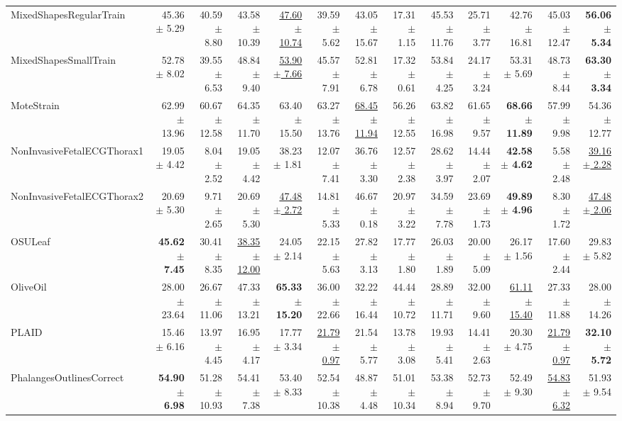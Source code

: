 \begin{landscape}
\begin{longtable}{lrrrrrrrrrrrr}
MixedShapesRegularTrain & 45.36 $\pm$ 5.29 & 40.59 $\pm$ 8.80 & 43.58 $\pm$ 10.39 & \underline{47.60 $\pm$ 10.74} & 39.59 $\pm$ 5.62 & 43.05 $\pm$ 15.67 & 17.31 $\pm$ 1.15 & 45.53 $\pm$ 11.76 & 25.71 $\pm$ 3.77 & 42.76 $\pm$ 16.81 & 45.03 $\pm$ 12.47 & \textbf{56.06 $\pm$ 5.34} \\
MixedShapesSmallTrain & 52.78 $\pm$ 8.02 & 39.55 $\pm$ 6.53 & 48.84 $\pm$ 9.40 & \underline{53.90 $\pm$ 7.66} & 45.57 $\pm$ 7.91 & 52.81 $\pm$ 6.78 & 17.32 $\pm$ 0.61 & 53.84 $\pm$ 4.25 & 24.17 $\pm$ 3.24 & 53.31 $\pm$ 5.69 & 48.73 $\pm$ 8.44 & \textbf{63.30 $\pm$ 3.34} \\
MoteStrain & 62.99 $\pm$ 13.96 & 60.67 $\pm$ 12.58 & 64.35 $\pm$ 11.70 & 63.40 $\pm$ 15.50 & 63.27 $\pm$ 13.76 & \underline{68.45 $\pm$ 11.94} & 56.26 $\pm$ 12.55 & 63.82 $\pm$ 16.98 & 61.65 $\pm$ 9.57 & \textbf{68.66 $\pm$ 11.89} & 57.99 $\pm$ 9.98 & 54.36 $\pm$ 12.77 \\
NonInvasiveFetalECGThorax1 & 19.05 $\pm$ 4.42 & 8.04 $\pm$ 2.52 & 19.05 $\pm$ 4.42 & 38.23 $\pm$ 1.81 & 12.07 $\pm$ 7.41 & 36.76 $\pm$ 3.30 & 12.57 $\pm$ 2.38 & 28.62 $\pm$ 3.97 & 14.44 $\pm$ 2.07 & \textbf{42.58 $\pm$ 4.62} & 5.58 $\pm$ 2.48 & \underline{39.16 $\pm$ 2.28} \\
NonInvasiveFetalECGThorax2 & 20.69 $\pm$ 5.30 & 9.71 $\pm$ 2.65 & 20.69 $\pm$ 5.30 & \underline{47.48 $\pm$ 2.72} & 14.81 $\pm$ 5.33 & 46.67 $\pm$ 0.18 & 20.97 $\pm$ 3.22 & 34.59 $\pm$ 7.78 & 23.69 $\pm$ 1.73 & \textbf{49.89 $\pm$ 4.96} & 8.30 $\pm$ 1.72 & \underline{47.48 $\pm$ 2.06} \\
OSULeaf & \textbf{45.62 $\pm$ 7.45} & 30.41 $\pm$ 8.35 & \underline{38.35 $\pm$ 12.00} & 24.05 $\pm$ 2.14 & 22.15 $\pm$ 5.63 & 27.82 $\pm$ 3.13 & 17.77 $\pm$ 1.80 & 26.03 $\pm$ 1.89 & 20.00 $\pm$ 5.09 & 26.17 $\pm$ 1.56 & 17.60 $\pm$ 2.44 & 29.83 $\pm$ 5.82 \\
OliveOil & 28.00 $\pm$ 23.64 & 26.67 $\pm$ 11.06 & 47.33 $\pm$ 13.21 & \textbf{65.33 $\pm$ 15.20} & 36.00 $\pm$ 22.66 & 32.22 $\pm$ 16.44 & 44.44 $\pm$ 10.72 & 28.89 $\pm$ 11.71 & 32.00 $\pm$ 9.60 & \underline{61.11 $\pm$ 15.40} & 27.33 $\pm$ 11.88 & 28.00 $\pm$ 14.26 \\
PLAID & 15.46 $\pm$ 6.16 & 13.97 $\pm$ 4.45 & 16.95 $\pm$ 4.17 & 17.77 $\pm$ 3.34 & \underline{21.79 $\pm$ 0.97} & 21.54 $\pm$ 5.77 & 13.78 $\pm$ 3.08 & 19.93 $\pm$ 5.41 & 14.41 $\pm$ 2.63 & 20.30 $\pm$ 4.75 & \underline{21.79 $\pm$ 0.97} & \textbf{32.10 $\pm$ 5.72} \\
PhalangesOutlinesCorrect & \textbf{54.90 $\pm$ 6.98} & 51.28 $\pm$ 10.93 & 54.41 $\pm$ 7.38 & 53.40 $\pm$ 8.33 & 52.54 $\pm$ 10.38 & 48.87 $\pm$ 4.48 & 51.01 $\pm$ 10.34 & 53.38 $\pm$ 8.94 & 52.73 $\pm$ 9.70 & 52.49 $\pm$ 9.30 & \underline{54.83 $\pm$ 6.32} & 51.93 $\pm$ 9.54 \\

\end{longtable}
\end{landscape}
